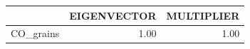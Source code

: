 \begin{tabular}{rrr}
  \hline
 & EIGENVECTOR & MULTIPLIER \\ 
  \hline
CO\_grains & 1.00 & 1.00 \\ 
   \hline
\end{tabular}
